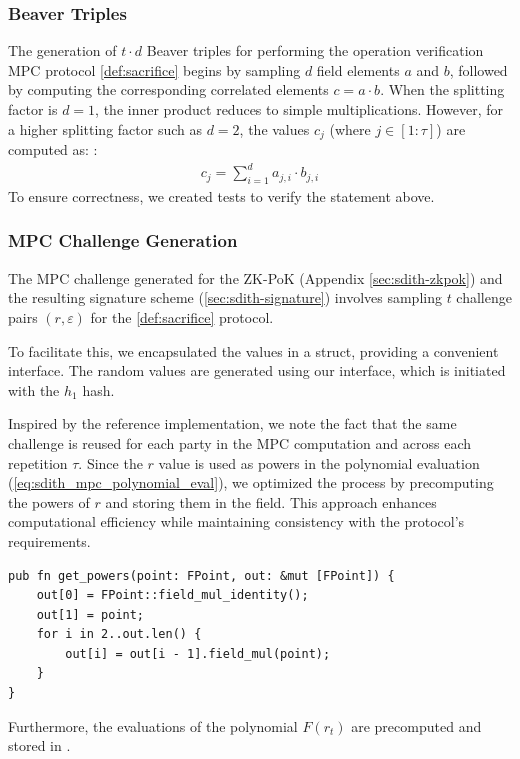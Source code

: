\documentclass[11pt]{report}
\theoremstyle{definition}
\theoremstyle{plain}
\begin{document}
\subsubsection{Beaver Triples}
The generation of $t \cdot d$ Beaver triples for performing the operation verification MPC protocol \autoref{def:sacrifice} begins by sampling $d$ field elements $a$ and $b$, followed by computing the corresponding correlated elements $c = a \cdot b$. When the splitting factor is $d=1$, the inner product reduces to simple multiplications. However, for a higher splitting factor such as $d=2$, the values $c_j$ (where $j \in [1:\tau]$) are computed as:
:
\begin{align}
  c_j = \sum_{i=1}^{d} a_{ j,i } \cdot b_{j,i}
\end{align}
To ensure correctness, we created tests to verify the statement above.

\subsubsection{MPC Challenge Generation}

The MPC challenge generated for the ZK-PoK (Appendix \ref{sec:sdith-zkpok}) and the resulting signature scheme (\autoref{sec:sdith-signature}) involves sampling $t$ challenge pairs $(r, \varepsilon)$ for the \autoref{def:sacrifice} protocol.

To facilitate this, we encapsulated the values in a  struct, providing a convenient interface. The random values are generated using our  interface, which is initiated with the $h_1$ hash.

Inspired by the reference implementation, we note the fact that the same challenge is reused for each party in the MPC computation and across each repetition $\tau$. Since the $r$ value is used as powers in the polynomial evaluation (\autoref{eq:sdith_mpc_polynomial_eval}), we optimized the process by precomputing the powers of $r$ and storing them in the  field. This approach enhances computational efficiency while maintaining consistency with the protocol's requirements.

\begin{verbatim}
pub fn get_powers(point: FPoint, out: &mut [FPoint]) {
    out[0] = FPoint::field_mul_identity();
    out[1] = point;
    for i in 2..out.len() {
        out[i] = out[i - 1].field_mul(point);
    }
}
\end{verbatim}

Furthermore, the evaluations of the polynomial $F(r_t)$ are precomputed and stored in .
\end{document}
